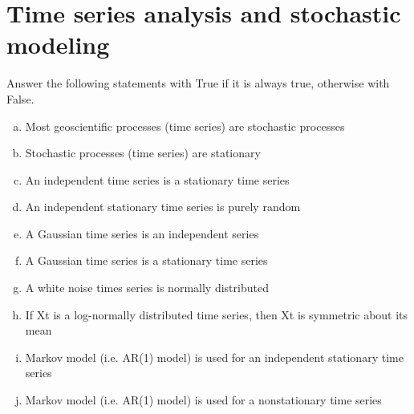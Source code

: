 \documentclass[12pt]{article}
\begin{document}
\section{Time series analysis and stochastic modeling}
Answer the following statements with True if it is always true, otherwise with False.
\begin{enumerate}[(a)] 
\item Most geoscientific processes (time series) are stochastic processes
\item Stochastic processes (time series) are stationary 
\item An independent time series is a stationary time series 
\item An independent stationary time series is purely random
\item A Gaussian time series is an independent series
\item A Gaussian time series is a stationary time series
\item A white noise times series is normally distributed
\item If Xt is a log-normally distributed time series, then Xt is symmetric about its mean
\item Markov model (i.e. AR(1) model) is used for an independent stationary time series
\item Markov model (i.e. AR(1) model) is used for a nonstationary time series
\end{enumerate}

\pagebreak


\end{document}
